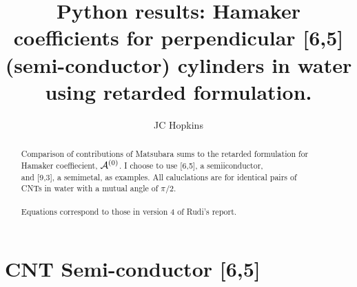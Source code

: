 \documentclass[a4paper]{article}
\title{\bf Python results: Hamaker coefficients for perpendicular [6,5]
(semi-conductor) cylinders in water using retarded formulation.}
\author{JC Hopkins}
\begin{document}
\maketitle
\begin{abstract}
Comparison of contributions of Matsubara sums to the retarded formulation for\\
Hamaker coeffiecient, ${\cal A}^{(0)}$.  I choose to use [6,5], a
semiiconductor,\\
and [9,3], a semimetal, as examples. All caluclations are for identical pairs
of\\
CNTs in water with a mutual angle of $\pi/2$. \\
\\
Equations correspond to those in version 4 of Rudi's report.
\end{abstract}
\tableofcontents

\section{CNT Semi-conductor [6,5]}
\end{document}
